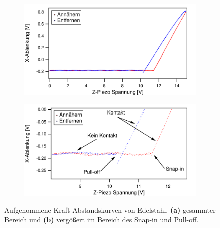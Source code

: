 \begin{figure}[H]
    \centering
    \begin{subfigure}{0.8\textwidth}
        \includegraphics[width=\textwidth]{bilder/Kraft_Abstand/Edelstahl2.pdf}
        \caption{}
    \end{subfigure}
    \begin{subfigure}{0.8\textwidth}
        \includegraphics[width=\textwidth]{bilder/Kraft_Abstand/Edelstahl.pdf}
        \caption{}
    \end{subfigure}
    \caption{Aufgenommene Kraft-Abstandskurven von Edelstahl. \textbf{(a)} gesammter Bereich und \textbf{(b)} vergößert im Bereich des Snap-in und Pull-off.}
    \label{fig:Edel}
\end{figure}
